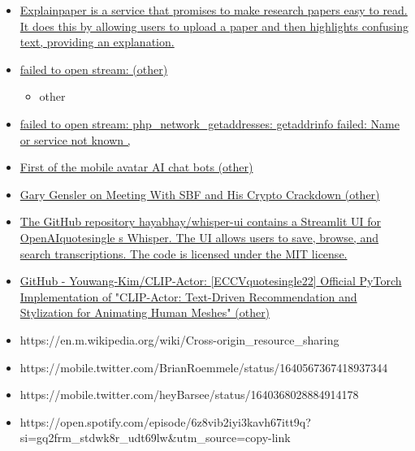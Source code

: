 \begin{itemize}
\begin{itemize}
    \begin{itemize}
     
    \item
    \end{itemize}
  \item
    \href{http://explainpaper.com}{Explainpaper is a service that
    promises to make research papers easy to read. It does this by
    allowing users to upload a paper and then highlights confusing text,
    providing an explanation.}
  \item
    \href{https://hongfz16.github.io/projects/avatarclip.html}{failed to
    open stream: (other)}

    \begin{itemize}
     
    \item
      other
    \end{itemize}
  \item
    \href{https://dex.bonfida.com/\#/market/e14bkbhdwd4eutkwj1oozezesgxmw8lpcps4w5puzzjo}{failed
    to open stream: php\_network\_getaddresses: getaddrinfo failed: Name
    or service not known ,}
  \item
    \href{https://www.d-id.com/chat/}{First of the mobile avatar AI chat
    bots (other)}
  \item
    \href{https://nymag.com/intelligencer/2023/02/gary-gensler-on-meeting-with-sbf-and-his-crypto-crackdown.html}{Gary
    Gensler on Meeting With SBF and His Crypto Crackdown (other)}
  \item
    \href{https://github.com/hayabhay/whisper-ui}{The GitHub repository
    hayabhay/whisper-ui contains a Streamlit UI for
    OpenAIquotesingle s Whisper. The UI allows users to save,
    browse, and search transcriptions. The code is licensed under the
    MIT license.}
  \item
    \href{https://github.com/youwang-kim/clip-actor}{GitHub -
    Youwang-Kim/CLIP-Actor: {[}ECCVquotesingle22{]} Official
    PyTorch Implementation of "CLIP-Actor: Text-Driven Recommendation
    and Stylization for Animating Human Meshes" (other)}
  \item
    https://en.m.wikipedia.org/wiki/Cross-origin\_resource\_sharing
  \item
    https://mobile.twitter.com/BrianRoemmele/status/1640567367418937344
  \item
    https://mobile.twitter.com/heyBarsee/status/1640368028884914178
  \item
    https://open.spotify.com/episode/6z8vib2iyi3kavh67itt9q?si=gq2frm\_stdwk8r\_udt69lw\&utm\_source=copy-link

\end{itemize}
\end{itemize}
